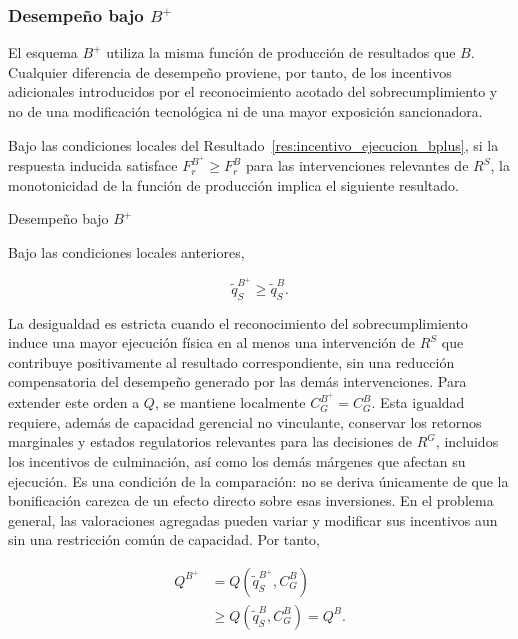 \subsubsection{Desempeño bajo \(B^{+}\)}

El esquema \(B^{+}\) utiliza la misma función de producción de resultados que \(B\). Cualquier diferencia de desempeño proviene, por tanto, de los incentivos adicionales introducidos por el reconocimiento acotado del sobrecumplimiento y no de una modificación tecnológica ni de una mayor exposición sancionadora.

Bajo las condiciones locales del Resultado~\ref{res:incentivo_ejecucion_bplus}, si la respuesta inducida satisface \(F_r^{B^{+}}\geq F_r^{B}\) para las intervenciones relevantes de \(R^{S}\), la monotonicidad de la función de producción implica el siguiente resultado.

\begin{resultadobox}
{Desempeño bajo \(B^{+}\)}
\label{res:desempeno_bplus}

Bajo las condiciones locales anteriores,

\begin{equation}
\widetilde q_S^{B^{+}}
\geq
\widetilde q_S^{B}.
\end{equation}

La desigualdad es estricta cuando el reconocimiento del sobrecumplimiento induce una mayor ejecución física en al menos una intervención de \(R^{S}\) que contribuye positivamente al resultado correspondiente, sin una reducción compensatoria del desempeño generado por las demás intervenciones. Para extender este orden a \(Q\), se mantiene localmente \(C_G^{B^{+}}=C_G^{B}\). Esta igualdad requiere, además de capacidad gerencial no vinculante, conservar los retornos marginales y estados regulatorios relevantes para las decisiones de \(R^{G}\), incluidos los incentivos de culminación, así como los demás márgenes que afectan su ejecución. Es una condición de la comparación: no se deriva únicamente de que la bonificación carezca de un efecto directo sobre esas inversiones. En el problema general, las valoraciones agregadas pueden variar y modificar sus incentivos aun sin una restricción común de capacidad. Por tanto,

\begin{equation}
\begin{aligned}
Q^{B^{+}}
&=
Q\!\left(
\widetilde q_S^{B^{+}},
C_G^{B}
\right)
\\
&\geq
Q\!\left(
\widetilde q_S^{B},
C_G^{B}
\right)
=
Q^{B}.
\end{aligned}
\end{equation}
\end{resultadobox}

